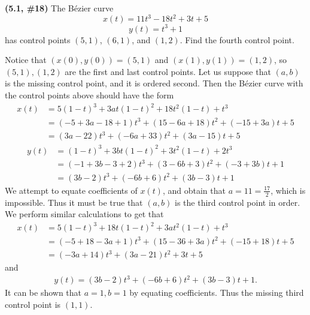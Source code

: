 \documentclass{eh-homework}
\begin{document}
\usetikzlibrary{arrows.meta}
\begin{question}{1}
\textbf{(5.1, \#18)} The Bézier curve
\[
x(t) = 11t^3 - 18t^2 + 3t + 5
\]
\[
y(t) = t^3 + 1
\]
has control points \((5,1)\), \((6,1)\), and \((1,2)\). Find the fourth control point.

\bigskip

Notice that \((x(0), y(0)) = (5,1)\) and \((x(1), y(1)) = (1,2)\), so \((5,1), (1,2)\) are the first and last control points. Let us suppose that \((a,b)\) is the missing control point, and it is ordered second. Then the B\'ezier curve with the control points above should have the form
\begin{align*}
    x(t) &= 5(1-t)^3 + 3at(1-t)^2 + 18t^2(1-t) + t^3 \\
    &= (-5 + 3a - 18 + 1)t^3 + (15 - 6a + 18)t^2 + (-15 + 3a)t + 5 \\
    &= (3a - 22)t^3 + (- 6a + 33)t^2 + (3a - 15)t + 5
\end{align*}
\begin{align*}
    y(t) &= (1-t)^3 + 3bt(1-t)^2 + 3t^2(1-t) + 2t^3 \\
    &= (-1 + 3b - 3 + 2)t^3 + (3 - 6b + 3)t^2 + (-3 + 3b)t + 1 \\
    &= (3b - 2)t^3 + (- 6b + 6)t^2 + (3b - 3)t + 1
\end{align*}
We attempt to equate coefficients of \(x(t)\), and obtain that \(a = 11 = \frac{17}{2}\), which is impossible. Thus it must be true that \((a,b)\) is the third control point in order. We perform similar calculations to get that
\begin{align*}
    x(t) &= 5(1-t)^3 + 18t(1-t)^2 + 3at^2(1-t) + t^3 \\
    &= (-5 + 18 - 3a + 1)t^3 + (15 - 36 + 3a)t^2 + (-15 + 18)t + 5 \\
    &= (-3a + 14)t^3 + (3a - 21)t^2 + 3t + 5
\end{align*}
and
\begin{align*}
    y(t) = (3b - 2)t^3 + (- 6b + 6)t^2 + (3b - 3)t + 1.
\end{align*}
It can be shown that \(a = 1, b = 1\) by equating coefficients. Thus the missing third control point is \((1,1)\).
\end{question}
\newpage
\end{document}
